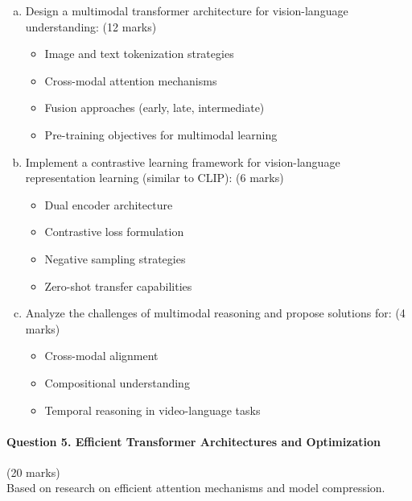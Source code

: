 \documentclass[12pt]{article}
\newcommand{\shortanswer}{\vspace{2cm}}
\newcommand{\mediumanswer}{\vspace{3cm}}
\newcommand{\journalspace}{\vspace{4.5cm}}
\begin{document}
\begin{enumerate}[(a)]
    \item Design a multimodal transformer architecture for vision-language understanding: \hfill (12 marks)
    \begin{itemize}
        \item Image and text tokenization strategies
        \item Cross-modal attention mechanisms
        \item Fusion approaches (early, late, intermediate)
        \item Pre-training objectives for multimodal learning
    \end{itemize}
    
    \journalspace
    
    \item Implement a contrastive learning framework for vision-language representation learning (similar to CLIP): \hfill (6 marks)
    \begin{itemize}
        \item Dual encoder architecture
        \item Contrastive loss formulation
        \item Negative sampling strategies
        \item Zero-shot transfer capabilities
    \end{itemize}
    
    \mediumanswer
    
    \item Analyze the challenges of multimodal reasoning and propose solutions for: \hfill (4 marks)
    \begin{itemize}
        \item Cross-modal alignment
        \item Compositional understanding
        \item Temporal reasoning in video-language tasks
    \end{itemize}
    
    \shortanswer
\end{enumerate}

\newpage
\paragraph{Question 5. Efficient Transformer Architectures and Optimization}\hfill (20 marks)\\
Based on research on efficient attention mechanisms and model compression.
\end{document}
